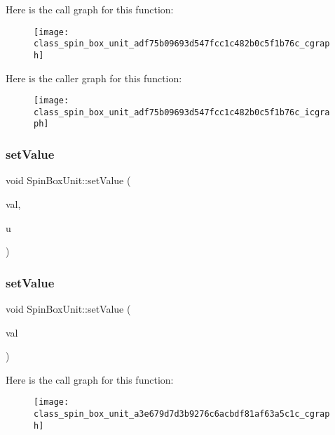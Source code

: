 Here is the call graph for this function\+:\nopagebreak
\begin{figure}[H]
\begin{center}
\leavevmode
\texttt{[image: class\_spin\_box\_unit\_adf75b09693d547fcc1c482b0c5f1b76c\_cgraph]}
\end{center}
\end{figure}
Here is the caller graph for this function\+:\nopagebreak
\begin{figure}[H]
\begin{center}
\leavevmode
\texttt{[image: class\_spin\_box\_unit\_adf75b09693d547fcc1c482b0c5f1b76c\_icgraph]}
\end{center}
\end{figure}
\mbox{\label{class_spin_box_unit_a73f6cd6df71f54dcc1c7282a8230bbeb}} 
\subsubsection{set\+Value\hspace{0.1cm}{\footnotesize\ttfamily [2/3]}}
{\footnotesize\ttfamily void Spin\+Box\+Unit\+::set\+Value (\begin{DoxyParamCaption}\item[{double}]{val,  }\item[{\textbf{ Spin\+Box\+Unit\+::unit}}]{u }\end{DoxyParamCaption})\hspace{0.3cm}{\ttfamily [slot]}}

\mbox{\label{class_spin_box_unit_a3e679d7d3b9276c6acbdf81af63a5c1c}} 
\subsubsection{set\+Value\hspace{0.1cm}{\footnotesize\ttfamily [3/3]}}
{\footnotesize\ttfamily void Spin\+Box\+Unit\+::set\+Value (\begin{DoxyParamCaption}\item[{double}]{val }\end{DoxyParamCaption})\hspace{0.3cm}{\ttfamily [slot]}}

Here is the call graph for this function\+:\nopagebreak
\begin{figure}[H]
\begin{center}
\leavevmode
\texttt{[image: class\_spin\_box\_unit\_a3e679d7d3b9276c6acbdf81af63a5c1c\_cgraph]}
\end{center}
\end{figure}
\mbox{\label{class_spin_box_unit_a9dca5b0d9c3042681cca0d645cd6d9ac}} 
